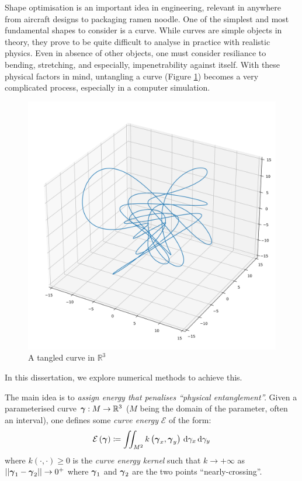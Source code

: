 \documentclass[../dissertation.tex]{subfiles}
\begin{document}
Shape optimisation is an important idea in engineering, relevant in anywhere from aircraft designs to packaging ramen noodle.
One of the simplest and most fundamental shapes to consider is a curve.
While curves are simple objects in theory, they prove to be quite difficult to analyse in practice with realistic physics.
Even in absence of other objects, one must consider resiliance to bending, stretching, and especially, impenetrability against itself.
With these physical factors in mind, untangling a curve (Figure \ref{fig: Knot}) becomes a very complicated process,
especially in a computer simulation.
\begin{figure}[tpb]
    \centering
    \includegraphics[scale=0.3]{sections/introductionImgs/knot}
    \caption{A tangled curve in $\mathbb{R}^3$}
    \label{fig: Knot}
\end{figure}
In this dissertation, we explore numerical methods to achieve this.

The main idea is to \emph{assign energy that penalises ``physical entanglement''.}
Given a parameterised curve $\boldsymbol{\gamma}:M \rightarrow \mathbb{R}^3$ ($M$ being the domain of the parameter, often an interval),
one defines some \emph{curve energy} $\mathcal{E}$ of the form:
\begin{equation}
    \mathcal{E} \left( \boldsymbol{\gamma} \right) \coloneqq \iint_{M^2} k\left( \boldsymbol{\gamma}_x, \boldsymbol{\gamma}_y \right) \, \text{d} \gamma_x \, \text{d} \gamma_y
\end{equation}
where $k\left( \cdot , \cdot \right) \geq 0$ is the \emph{curve energy kernel} such that $k \rightarrow +\infty$ as $\lvert \lvert \boldsymbol{\gamma}_1 - \boldsymbol{\gamma}_2 \rvert \rvert \rightarrow 0^+$ where $\boldsymbol{\gamma}_1$ and $\boldsymbol{\gamma}_2$ are the two points ``nearly-crossing''.
\end{document}
